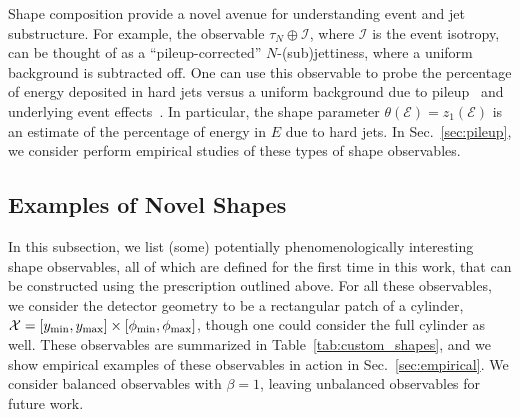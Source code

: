 \documentclass[letterpaper,11pt]{article}
\newcommand{\E}{\mathcal{E}}
\DeclareRobustCommand{\Sec}[1]{Sec.~\ref{sec:#1}}
\DeclareRobustCommand{\Tab}[1]{Table~\ref{tab:#1}}
\begin{document}
Shape composition provide a novel avenue for understanding event and jet substructure. For example, the observable $\tau_N \oplus \mathcal{I}$, where $\mathcal{I}$ is the event isotropy, can be thought of as a ``pileup-corrected'' $N$-(sub)jettiness, where a uniform background is subtracted off. One can use this observable to probe the percentage of energy deposited in hard jets versus a uniform background due to pileup~\cite{Soyez:2018opl} and underlying event effects~\cite{PhysRevD.65.092002, Agocs:2010ft}. In particular, the shape parameter $\theta(\E) = z_1(\E)$ is an estimate of the percentage of energy in $E$ due to hard jets. In \Sec{pileup}, we consider perform empirical studies of these types of shape observables.



\subsection{Examples of Novel Shapes}\label{sec:custom_shapes}

In this subsection, we list (some) potentially phenomenologically interesting shape observables, all of which are defined for the first time in this work, that can be constructed using the prescription outlined above. For all these observables, we consider the detector geometry to be a rectangular patch of a cylinder, $\mathcal{X} = [y_{\rm min}, y_{\rm max}] \times [\phi_{\rm min}, \phi_{\rm max}]$, though one could consider the full cylinder as well. These observables are summarized in \Tab{custom_shapes}, and we show empirical examples of these observables in action in \Sec{empirical}. We consider balanced observables with $\beta = 1$, leaving unbalanced observables for future work. 
\end{document}
